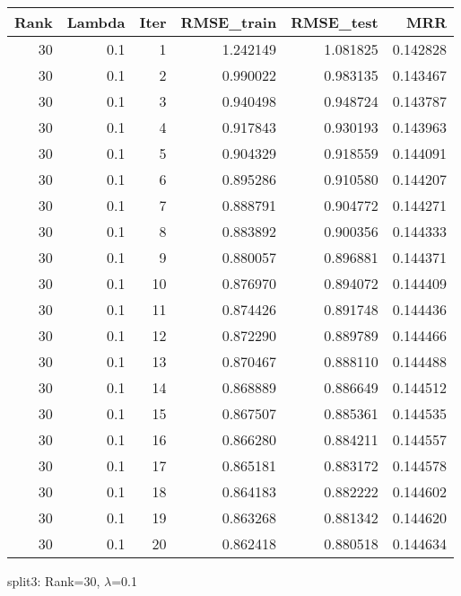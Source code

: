 \begin{tabular}{rrrrrr}
\toprule
 Rank &  Lambda &  Iter &  RMSE\_train &  RMSE\_test &       MRR \\
\midrule
   30 &     0.1 &     1 &    1.242149 &   1.081825 &  0.142828 \\
   30 &     0.1 &     2 &    0.990022 &   0.983135 &  0.143467 \\
   30 &     0.1 &     3 &    0.940498 &   0.948724 &  0.143787 \\
   30 &     0.1 &     4 &    0.917843 &   0.930193 &  0.143963 \\
   30 &     0.1 &     5 &    0.904329 &   0.918559 &  0.144091 \\
   30 &     0.1 &     6 &    0.895286 &   0.910580 &  0.144207 \\
   30 &     0.1 &     7 &    0.888791 &   0.904772 &  0.144271 \\
   30 &     0.1 &     8 &    0.883892 &   0.900356 &  0.144333 \\
   30 &     0.1 &     9 &    0.880057 &   0.896881 &  0.144371 \\
   30 &     0.1 &    10 &    0.876970 &   0.894072 &  0.144409 \\
   30 &     0.1 &    11 &    0.874426 &   0.891748 &  0.144436 \\
   30 &     0.1 &    12 &    0.872290 &   0.889789 &  0.144466 \\
   30 &     0.1 &    13 &    0.870467 &   0.888110 &  0.144488 \\
   30 &     0.1 &    14 &    0.868889 &   0.886649 &  0.144512 \\
   30 &     0.1 &    15 &    0.867507 &   0.885361 &  0.144535 \\
   30 &     0.1 &    16 &    0.866280 &   0.884211 &  0.144557 \\
   30 &     0.1 &    17 &    0.865181 &   0.883172 &  0.144578 \\
   30 &     0.1 &    18 &    0.864183 &   0.882222 &  0.144602 \\
   30 &     0.1 &    19 &    0.863268 &   0.881342 &  0.144620 \\
   30 &     0.1 &    20 &    0.862418 &   0.880518 &  0.144634 \\
\bottomrule
\end{tabular}

\caption{split3: Rank=30, $\lambda$=0.1}
